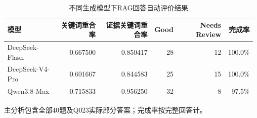 \begin{table}[htbp]
\centering\footnotesize
\setlength{\tabcolsep}{4pt}
\caption{不同生成模型下RAG回答自动评价结果}
\label{tab:cm-auto}
\begin{tabular}{lrrrrr}
\toprule
模型 & 关键词重合率 & 证据关键词重合率 & Good & Needs Review & 完成率 \\
\midrule
DeepSeek-Flash & 0.667500 & 0.850417 & 28 & 12 & 100.0\% \\
DeepSeek-V4-Pro & 0.601667 & 0.844583 & 25 & 15 & 100.0\% \\
Qwen3.8-Max & 0.715833 & 0.956250 & 32 & 8 & 97.5\% \\
\bottomrule
\end{tabular}
\par\smallskip\raggedright 主分析包含全部40题及Q023实际部分答案；完成率按完整回答计。
\end{table}
